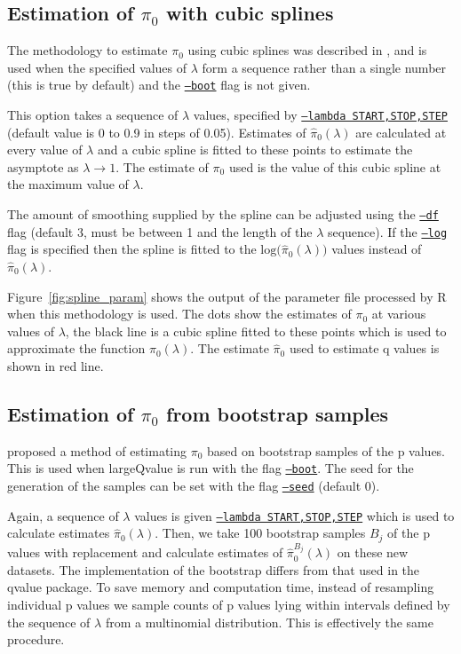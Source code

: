 \documentclass{amsart}
\begin{document}
\subsection{Estimation of $\pi_0$ with cubic splines}
\label{sec:spline}
The methodology to estimate $\pi_0$ using cubic splines was described in \citet{splinestorey}, and is used when the specified values of $\lambda$ form a sequence rather than a single number (this is true by default) and the \underline{\texttt{--boot}} flag is not given.

This option takes a sequence of $\lambda$ values, specified by \underline{\texttt{--lambda START,STOP,STEP}} (default value is 0 to 0.9 in steps of 0.05). Estimates of $\hat{\pi}_0(\lambda)$ are calculated at every value of $\lambda$ and a cubic spline is fitted to these points to estimate the asymptote as $\lambda\rightarrow1$. The estimate of $\pi_0$ used is the value of this cubic spline at the maximum value of $\lambda$.

The amount of smoothing supplied by the spline can be adjusted using the \underline{\texttt{--df}} flag (default 3, must be between 1 and the length of the $\lambda$ sequence). If the \underline{\texttt{--log}} flag is specified then the spline is fitted to the $\text{log(}\hat{\pi}_0(\lambda))$ values instead of $\hat{\pi}_0(\lambda)$.

Figure~\ref{fig:spline_param} shows the output of the parameter file processed by R when this methodology is used. The dots show the estimates of $\pi_0$ at various values of $\lambda$, the black line is a cubic spline fitted to these points which is used to approximate the function $\pi_0(\lambda)$. The estimate $\hat{\pi}_0$ used to estimate q values is shown in red line.

\subsection{Estimation of $\pi_0$ from bootstrap samples}
\label{sec:boot}
\citet{bootstorey} proposed a method of estimating $\pi_0$ based on bootstrap samples of the p values. This is used when largeQvalue is run with the flag \underline{\texttt{--boot}}. The seed for the generation of the samples can be set with the flag \underline{\texttt{--seed}} (default 0).

Again, a sequence of $\lambda$ values is given \underline{\texttt{--lambda START,STOP,STEP}} which is used to calculate estimates $\hat{\pi}_0(\lambda)$. Then, we take 100 bootstrap samples $B_j$ of the p values with replacement and calculate estimates of  $\hat{\pi}^{B_j}_0(\lambda)$ on these new datasets. The implementation of the bootstrap differs from that used in the qvalue package. To save memory and computation time, instead of resampling individual p values we sample counts of p values lying within intervals defined by the sequence of $\lambda$ from a multinomial distribution. This is effectively the same procedure.
\end{document}
